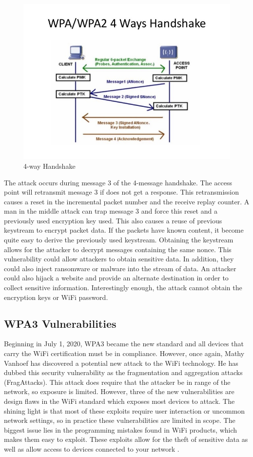 \documentclass[acmlarge]{acmart}
\begin{document}
\begin{figure}[H]
  \centering
  \includegraphics[width=0.5\linewidth]{imgs/wpa-4way.jpg}
  \caption{4-way Handshake \cite{t_2021}}
  \label{fig:4way}
\end{figure}

The attack occurs during message 3 of the 4-message handshake. The access point will retransmit message 3 if does not get a response. This retransmission causes a reset in the incremental packet number and the receive replay counter. A man in the middle attack can trap message 3 and force this reset and a previously used encryption key used. This also causes a reuse of previous keystream to encrypt packet data. If the packets have known content, it become quite easy to derive the previously used keystream. Obtaining the keystream allows for the attacker to decrypt messages containing the same nonce.
This vulnerability could allow attackers to obtain sensitive data. In addition, they could also inject ransomware or malware into the stream of data. An attacker could also hijack a website and provide an alternate destination in order to collect sensitive information. Interestingly enough, the attack cannot obtain the encryption keys or WiFi password.

\subsection{WPA3 Vulnerabilities}

Beginning in July 1, 2020, WPA3 became the new standard and all devices that carry the WiFi certification must be in compliance. However, once again, Mathy Vanhoef has discovered a potential new attack to the WiFi technology. He has dubbed this security vulnerability as the fragmentation and aggregation attacks (FragAttacks). This attack does require that the attacker be in range of the network, so exposure is limited. However, three of the new vulnerabilities are design flaws in the WiFi standard which exposes most devices to attack. The shining light is that most of these exploits require user interaction or uncommon network settings, so in practice these vulnerabilities are limited in scope. The biggest issue lies in the programming mistakes found in WiFi products, which makes them easy to exploit. These exploits allow for the theft of sensitive data as well as allow access to devices connected to your network \cite{vanhoef2021fragment}.
\end{document}
